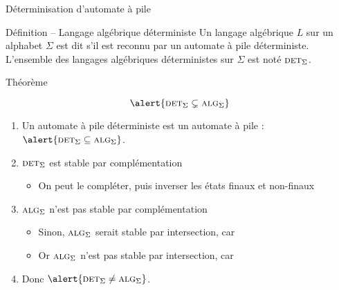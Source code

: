
\begingroup

\begin{frame}{Déterminisation d'automate à pile}

  \begin{block}{Définition -- Langage algébrique déterministe}
    Un langage algébrique $L$ sur un alphabet $\Sigma$ est dit  s'il est \alert{reconnu par un automate à pile déterministe}.\\
    L'ensemble des langages algébriques déterministes sur $\Sigma$ est noté \alert{$\textsc{det}_\Sigma$}.
  \end{block}
  
  \begin{block}{Théorème}
    
    \vspace{-4mm}
    $$\alert{\textsc{det}_\Sigma \subsetneq \textsc{alg}_\Sigma}$$

    \vspace{-1mm}
    \begin{enumerate}
    \item Un automate à pile déterministe est un automate à pile : $\alert{\textsc{det}_\Sigma \subseteq \textsc{alg}_\Sigma}$.
    \item $\textsc{det}_\Sigma$ est stable par complémentation
      \begin{itemize}
      \item On peut le compléter, puis inverser les états finaux et non-finaux
      \end{itemize}
    \item $\textsc{alg}_\Sigma$ n'est pas stable par complémentation
      \begin{itemize}
      \item Sinon, $\textsc{alg}_\Sigma$ serait stable par intersection, car 
      \item Or $\textsc{alg}_\Sigma$ n'est pas stable par intersection, car 
      \end{itemize}
    \item Donc $\alert{\textsc{det}_\Sigma \neq \textsc{alg}_\Sigma}$.
    \end{enumerate}
  \end{block}

\end{frame}

\endgroup
